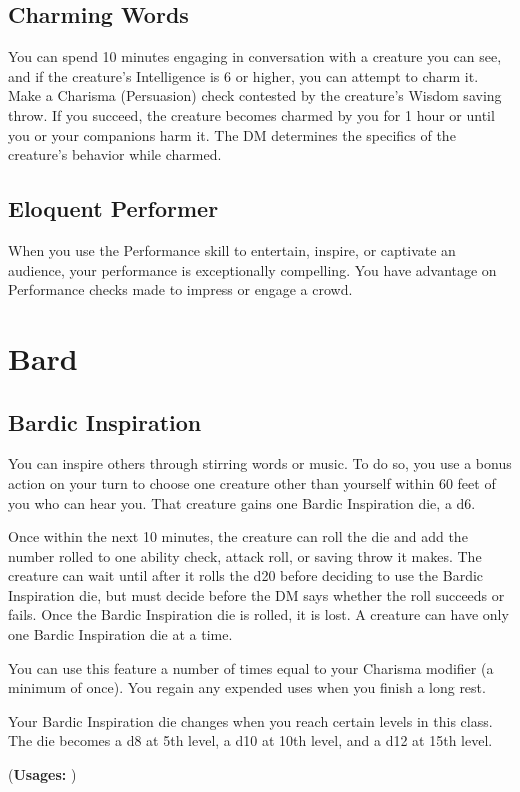\documentclass[letterpaper,openany,oneside,twocolumn]{book}
\begin{document}
\subsection*{Charming Words}
You can spend 10 minutes engaging in conversation with a creature you can see, and if the creature's Intelligence is 6 or higher, you can attempt to charm it. Make a Charisma (Persuasion) check contested by the creature's Wisdom saving throw. If you succeed, the creature becomes charmed by you for 1 hour or until you or your companions harm it. The DM determines the specifics of the creature's behavior while charmed.
\subsection*{Eloquent Performer}
When you use the Performance skill to entertain, inspire, or captivate an audience, your performance is exceptionally compelling. You have advantage on Performance checks made to impress or engage a crowd.

\section*{Bard}
\subsection*{Bardic Inspiration}
You can inspire others through stirring words or music. To do so, you use a bonus action on your turn to choose one creature other than yourself within 60 feet of you who can hear you. That creature gains one Bardic Inspiration die, a d6.

Once within the next 10 minutes, the creature can roll the die and add the number rolled to one ability check, attack roll, or saving throw it makes. The creature can wait until after it rolls the d20 before deciding to use the Bardic Inspiration die, but must decide before the DM says whether the roll succeeds or fails. Once the Bardic Inspiration die is rolled, it is lost. A creature can have only one Bardic Inspiration die at a time.

You can use this feature a number of times equal to your Charisma modifier (a minimum of once). You regain any expended uses when you finish a long rest.

Your Bardic Inspiration die changes when you reach certain levels in this class. The die becomes a d8 at 5th level, a d10 at 10th level, and a d12 at 15th level.

(\textbf{Usages: })
\end{document}
